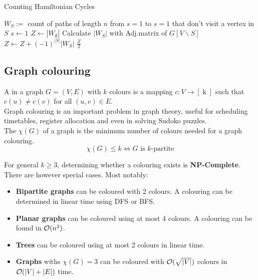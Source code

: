 \documentclass[a3paper, landscape, 11pt]{article} %
\begin{document}
\begin{multicols*}{4}
\begin{algorithm}[H]
\caption{Counting Hamiltonian Cycles}
\begin{algorithmic}[1]
\vspace{3pt}
\Statex $W_S:=$ count of paths of length $n$ from $s=1$ to $s=1$ that don't visit a vertex in $S$
\vspace{5pt}
\State $s \gets 1$ 
\State $Z \gets |W_{\emptyset}|$ 
	\State Calculate $|W_S|$ with Adj.matrix of $G[V\backslash S]$
	\State $Z \gets Z + (-1)^{|S|} |W_S|$
\EndFor
\State
\Return $\tfrac{Z}{2}$ 
\EndProcedure
\end{algorithmic}
\end{algorithm}



\vfill %

\subsection*{Graph colouring}

A  in a graph $G=(V,E)$ with $k$ colours is a mapping $c: V \rightarrow [\operatorname{k}]$ such that $ c(u) \ne c(v) $ for all $(u,v)\in E$.\\

Graph colouring is an important problem in graph theory, useful for scheduling timetables, register allocation and even in solving Sudoko puzzles.\\

The  $\chi(G)$ of a graph is the minimum number of colours needed for a graph colouring. 
$$\chi(G) \le k \Longleftrightarrow \text{$G$ is $k$-partite} $$

For general $k\ge3$, determining whether a colouring exists is \textbf{NP-Complete}. There are however special cases. Most notably:
\begin{itemize}[label=$\diamond$]
	\item \textbf{Bipartite graphs} can be coloured with 2 colours. A colouring can be determined in linear time using DFS or BFS.
	\item \textbf{Planar graphs} can be coloured using at most 4 colours. A colouring can be found in  $\mathcal{O}(n^2)$.
	\item \textbf{Trees} can be coloured using at most 2 colours in linear time.
	\item \textbf{Graphs} withs $\chi(G)=3$ can be coloured with $\mathcal{O}(\sqrt{|V|})$ colours in $\mathcal{O}(|V|+|E|)$ time.
\end{itemize}


\end{multicols*}
\end{document}
